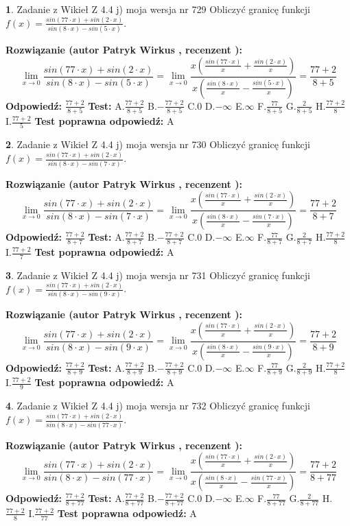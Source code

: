 \documentclass[12pt, a4paper]{article}
\theoremstyle{definition} %
\newtheorem{zad}{}
\newcommand{\zadStart}[1]{\begin{zad}#1\newline}
\newcommand{\zadStop}{\end{zad}}
\newcommand{\rozwStart}[2]{\noindent \textbf{Rozwiązanie (autor #1 , recenzent #2): }\newline}
\newcommand{\rozwStop}{\newline}
\newcommand{\odpStart}{\noindent \textbf{Odpowiedź:}\newline}
\newcommand{\odpStop}{\newline}
\newcommand{\testStart}{\noindent \textbf{Test:}\newline}
\newcommand{\testStop}{\newline}
\newcommand{\kluczStart}{\noindent \textbf{Test poprawna odpowiedź:}\newline}
\newcommand{\kluczStop}{\newline}
\begin{document}
\zadStart{Zadanie z Wikieł Z 4.4 j) moja wersja nr 729}
Obliczyć granicę funkcji $f(x)=\frac{sin(77\cdot x) +sin(2\cdot x)}{sin(8\cdot x) -sin(5\cdot x)}$.
\zadStop
\rozwStart{Patryk Wirkus}{}
$$\lim\limits_{x\to 0}\frac{sin(77\cdot x) +sin(2\cdot x)}{sin(8\cdot x) -sin(5\cdot x)}=\lim\limits_{x\to 0}\frac{x(\frac{sin(77\cdot x)}{x}+\frac{sin(2\cdot x)}{x})}{x(\frac{sin(8\cdot x)}{x}-\frac{sin(5\cdot x)}{x})}=\frac{77+2}{8+5}$$
\rozwStop
\odpStart
$\frac{77+2}{8+5}$
\odpStop
\testStart
A.$\frac{77+2}{8+5}$
B.$-\frac{77+2}{8+5}$
C.$0$
D.$-\infty$
E.$\infty$
F.$\frac{77}{8+5}$
G.$\frac{2}{8+5}$
H.$\frac{77+2}{8}$
I.$\frac{77+2}{5}$
\testStop
\kluczStart
A
\kluczStop



\zadStart{Zadanie z Wikieł Z 4.4 j) moja wersja nr 730}
Obliczyć granicę funkcji $f(x)=\frac{sin(77\cdot x) +sin(2\cdot x)}{sin(8\cdot x) -sin(7\cdot x)}$.
\zadStop
\rozwStart{Patryk Wirkus}{}
$$\lim\limits_{x\to 0}\frac{sin(77\cdot x) +sin(2\cdot x)}{sin(8\cdot x) -sin(7\cdot x)}=\lim\limits_{x\to 0}\frac{x(\frac{sin(77\cdot x)}{x}+\frac{sin(2\cdot x)}{x})}{x(\frac{sin(8\cdot x)}{x}-\frac{sin(7\cdot x)}{x})}=\frac{77+2}{8+7}$$
\rozwStop
\odpStart
$\frac{77+2}{8+7}$
\odpStop
\testStart
A.$\frac{77+2}{8+7}$
B.$-\frac{77+2}{8+7}$
C.$0$
D.$-\infty$
E.$\infty$
F.$\frac{77}{8+7}$
G.$\frac{2}{8+7}$
H.$\frac{77+2}{8}$
I.$\frac{77+2}{7}$
\testStop
\kluczStart
A
\kluczStop



\zadStart{Zadanie z Wikieł Z 4.4 j) moja wersja nr 731}
Obliczyć granicę funkcji $f(x)=\frac{sin(77\cdot x) +sin(2\cdot x)}{sin(8\cdot x) -sin(9\cdot x)}$.
\zadStop
\rozwStart{Patryk Wirkus}{}
$$\lim\limits_{x\to 0}\frac{sin(77\cdot x) +sin(2\cdot x)}{sin(8\cdot x) -sin(9\cdot x)}=\lim\limits_{x\to 0}\frac{x(\frac{sin(77\cdot x)}{x}+\frac{sin(2\cdot x)}{x})}{x(\frac{sin(8\cdot x)}{x}-\frac{sin(9\cdot x)}{x})}=\frac{77+2}{8+9}$$
\rozwStop
\odpStart
$\frac{77+2}{8+9}$
\odpStop
\testStart
A.$\frac{77+2}{8+9}$
B.$-\frac{77+2}{8+9}$
C.$0$
D.$-\infty$
E.$\infty$
F.$\frac{77}{8+9}$
G.$\frac{2}{8+9}$
H.$\frac{77+2}{8}$
I.$\frac{77+2}{9}$
\testStop
\kluczStart
A
\kluczStop



\zadStart{Zadanie z Wikieł Z 4.4 j) moja wersja nr 732}
Obliczyć granicę funkcji $f(x)=\frac{sin(77\cdot x) +sin(2\cdot x)}{sin(8\cdot x) -sin(77\cdot x)}$.
\zadStop
\rozwStart{Patryk Wirkus}{}
$$\lim\limits_{x\to 0}\frac{sin(77\cdot x) +sin(2\cdot x)}{sin(8\cdot x) -sin(77\cdot x)}=\lim\limits_{x\to 0}\frac{x(\frac{sin(77\cdot x)}{x}+\frac{sin(2\cdot x)}{x})}{x(\frac{sin(8\cdot x)}{x}-\frac{sin(77\cdot x)}{x})}=\frac{77+2}{8+77}$$
\rozwStop
\odpStart
$\frac{77+2}{8+77}$
\odpStop
\testStart
A.$\frac{77+2}{8+77}$
B.$-\frac{77+2}{8+77}$
C.$0$
D.$-\infty$
E.$\infty$
F.$\frac{77}{8+77}$
G.$\frac{2}{8+77}$
H.$\frac{77+2}{8}$
I.$\frac{77+2}{77}$
\testStop
\kluczStart
A
\kluczStop
\end{document}
